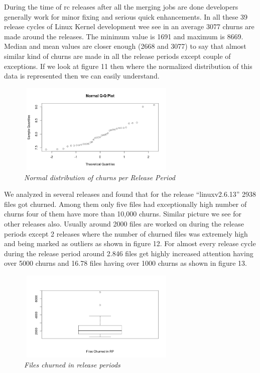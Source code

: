 \documentclass{acm_proc_article-sp}
\begin{document}
During the time of rc releases after all the merging jobs are done developers generally work for minor fixing and serious quick enhancements. In all these 39 release cycles of Linux Kernel development wee see in an average 3077 churns are made around the releases. The minimum value is 1691 and maximum is 8669. Median and mean values are closer enough (2668 and 3077) to say that almost similar kind of churns are made in all the release periods except couple of exceptions. If we look at figure 11 then where the normalized distribution of this data is represented then we can easily understand.
\begin{figure}
\begin{center}
\includegraphics[height=1.7in,width=3in]{churnRPnorm.png}
\caption{\small \sl Normal distribution of churns per Release Period}
\end{center}
\end{figure}

We analyzed in several releases and found that for the release ``linuxv2.6.13'' 2938 files got churned. Among them only five files had exceptionally high number of churns four of them have more than 10,000 churns. Similar picture we see for other releases also. Usually around 2000 files are worked on during the release periods except 2 releases where the number of churned files was extremely high and being marked as outliers as shown in figure 12. For almost every release cycle during the release period around 2.846 files get highly increased attention having over 5000 churns and 16.78 files having over 1000 churns as shown in figure 13.
\begin{figure}
\begin{center}
\includegraphics[height=1.7in,width=3in]{fileChurnRPbox.png}
\caption{\small \sl Files churned in release periods}
\end{center}
\end{figure}
\end{document}
